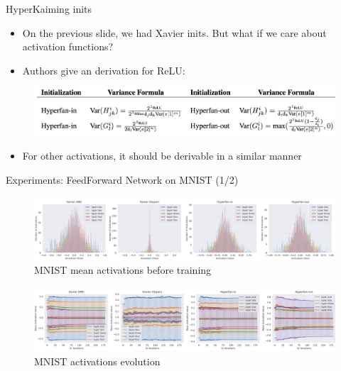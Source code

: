 \documentclass[handout, 10pt]{beamer}
\begin{document}
\begin{frame}{HyperKaiming inits}
    \begin{itemize}
        \item\pause On the previous slide, we had Xavier inits. But what if we care about activation functions?
        \item\pause Authors give an derivation for ReLU:
    \end{itemize}
    \begin{figure}
        \centering
        \includegraphics[width=\textwidth]{images/hyperkaiming.png}
    \end{figure}
    \begin{itemize}
        \item\pause For other activations, it should be derivable in a similar manner
    \end{itemize}
\end{frame}


\begin{frame}{Experiments: FeedForward Network on MNIST (1/2)}

\begin{figure}
    \centering
    \includegraphics[width=\textwidth]{images/mnist-activations-before-training.png}
    \caption{MNIST mean activations before training}
\end{figure}

\begin{figure}
    \centering
    \includegraphics[width=\textwidth]{images/mnist-activations-evolution.png}
    \caption{MNIST activations evolution}
\end{figure}

\end{frame}
\end{document}
